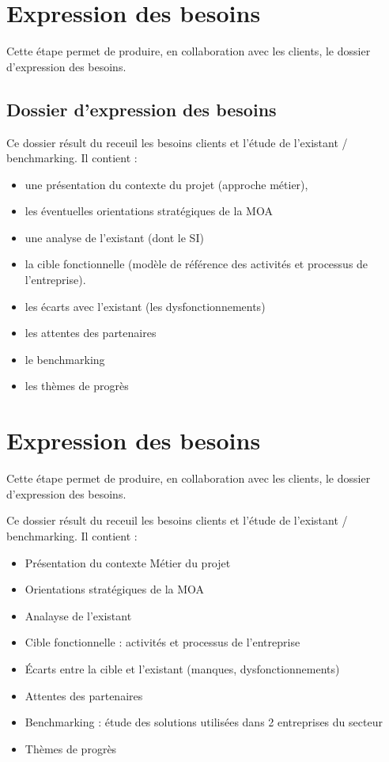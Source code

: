 	\section{Expression des besoins}

		Cette étape permet de produire, en collaboration avec les clients, le dossier d'expression des besoins.

		\subsection{Dossier d'expression des besoins}

		 Ce dossier résult du receuil les besoins clients et l'étude de l'existant / benchmarking. Il contient :

		\begin{itemize}
		    \item une présentation du contexte du projet (approche métier),
		    \item les éventuelles orientations stratégiques de la MOA
		    \item une analyse de l’existant (dont le SI)
		    \item la cible fonctionnelle (modèle de référence des activités et processus de l’entreprise).
		    \item les écarts avec l’existant (les dysfonctionnements)
		    \item les attentes des partenaires
		    \item le benchmarking
		    \item les thèmes de progrès
		\end{itemize}

	\section{Expression des besoins}

		Cette étape permet de produire, en collaboration avec les clients, le dossier d'expression des besoins.

		Ce dossier résult du receuil les besoins clients et l'étude de l'existant / benchmarking. Il contient :
		\begin{itemize}
		    \item Présentation du contexte Métier du projet
		    \item Orientations stratégiques de la MOA
		    \item Analayse de l’existant
		    \item Cible fonctionnelle : activités et processus de l’entreprise
		    \item Écarts entre la cible et l’existant (manques, dysfonctionnements)
		    \item Attentes des partenaires
		    \item Benchmarking : étude des solutions utilisées dans 2 entreprises du secteur
		    \item Thèmes de progrès
		\end{itemize}


